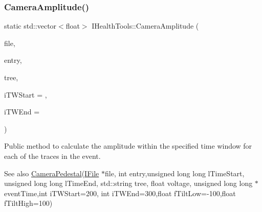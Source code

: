 \subsubsection{\texorpdfstring{Camera\+Amplitude()}{CameraAmplitude()}\hspace{0.1cm}{\footnotesize\ttfamily [2/3]}}
{\footnotesize\ttfamily static std\+::vector$<$float$>$ I\+Health\+Tools\+::\+Camera\+Amplitude (\begin{DoxyParamCaption}\item[{\hyperlink{classIFile}{I\+File} $\ast$}]{file,  }\item[{int}]{entry,  }\item[{std\+::string}]{tree,  }\item[{int}]{i\+T\+W\+Start = {},  }\item[{int}]{i\+T\+W\+End = {} }\end{DoxyParamCaption})\hspace{0.3cm}{\ttfamily [static]}}



Public method to calculate the amplitude within the specified time window for each of the traces in the event. 

\begin{DoxySeeAlso}{See also}
\hyperlink{classIHealthTools_aa6bdf03f0f7595eec0a894c7c73134ea}{Camera\+Pedestal}(\hyperlink{classIFile}{I\+File} $\ast$file, int entry,unsigned long long l\+Time\+Start, unsigned long long l\+Time\+End, std\+::string tree, float voltage, unsigned long long $\ast$event\+Time,int i\+T\+W\+Start=200, int i\+T\+W\+End=300,float f\+Tilt\+Low=-\/100,float f\+Tilt\+High=100)
\end{DoxySeeAlso}

